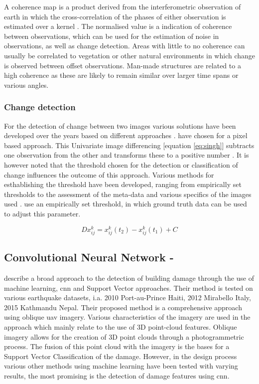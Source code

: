\noindent A coherence map is a product derived from the interferometric observation of earth in which the cross-correlation of the phases of either observation is estimated over a kernel \citep{Hanssen2001, Ferretti2007}. The normalised value is a indication of coherence between observations, which can be used for the estimation of noise in observations, as well as change detection. Areas with little to no coherence can usually be correlated to vegetation or other natural environments in which change is observed between offset observations. Man-made structures are related to a high coherence as these are likely to remain similar over larger time spans or various angles. 
 
\subsubsection*{Change detection}
For the detection of change between two images various solutions have been developed over the years based on different approaches \citep{Singh1989, Tewkesbury2015}. \citet{Yun2015} have chosen for a pixel based approach. This Univariate image differencing [equation \ref{eq:singh}] subtracts one observation from the other and transforms these to a positive number \citep{Singh1989}. It is however noted that the threshold chosen for the detection or classification of change influences the outcome of this approach. Various methods for esthablishing the threshold have been developed, ranging from empirically set thresholds to the assessment of the meta-data and various specifics of the images used \citep{Singh1989}. \citet{Yun2015} use an empirically set threshold, in which ground truth data can be used to adjust this parameter.

\begin{equation}
Dx_{ij}^k = x_{ij}^k(t_2) - x_{ij}^k(t_1) + C
\label{eq:singh}
\end{equation}
 
\subsection{Convolutional Neural Network - \cite{Vetrivel2016b}} \label{sec:vet}
\citet{Vetrivel2016b} describe a broad approach to the detection of building damage through the use of machine learning, \ac{cnn} and Support Vector approaches. Their method is tested on various earthquake datasets, i.a. 2010 Port-au-Prince Haiti, 2012 Mirabello Italy, 2015 Kathmandu Nepal. Their proposed method is a comprehensive approach using oblique \ac{uav} imagery. Various characteristics of the imagery are used in the approach which mainly relate to the use of 3D point-cloud features. Oblique imagery allows for the creation of 3D point clouds through a photogrammetric process. The fusion of this point cloud with the imagery is the bases for a Support Vector Classification of the damage. However, in the design process various other methods using machine learning have been tested with varying results, the most promising is the detection of damage features using \ac{cnn}.\\


